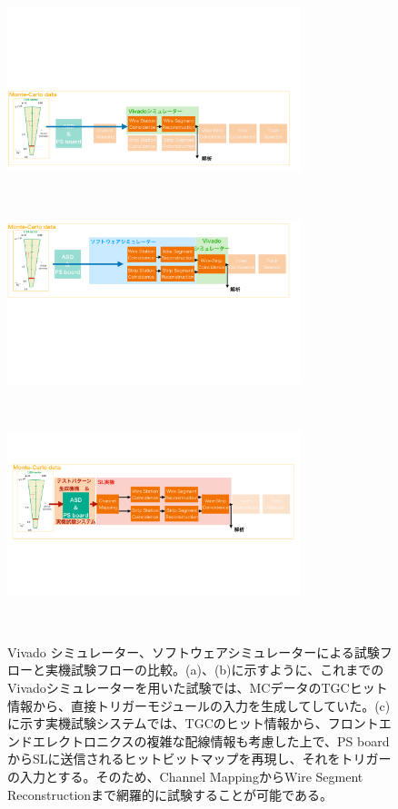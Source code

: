 \begin{figure}
    \begin{minipage}[b]{0.9\linewidth}
    \centering
    \includegraphics[height=4.8cm]{fig/Test/Flow_Wire.pdf}
    \end{minipage}\\
    \begin{minipage}[b]{0.9\linewidth}
        \centering
        \includegraphics[height=4.8cm]{fig/Test/Flow_WS.pdf}
    \end{minipage}\\
        \begin{minipage}[b]{0.9\linewidth}
            \centering
            \includegraphics[height=4.8cm]{fig/Test/Flow_zikki.pdf}
        \end{minipage}\\
    
    \caption[試験フロー]{Vivado シミュレーター、ソフトウェアシミュレーターによる試験フローと実機試験フローの比較。(a)、(b)に示すように、これまでのVivadoシミュレーターを用いた試験では、MCデータのTGCヒット情報から、直接トリガーモジュールの入力を生成してしていた。(c)に示す実機試験システムでは、TGCのヒット情報から、フロントエンドエレクトロニクスの複雑な配線情報も考慮した上で、PS boardからSLに送信されるヒットビットマップを再現し、それをトリガーの入力とする。そのため、Channel MappingからWire Segment Reconstructionまで網羅的に試験することが可能である。}
    \label{Test_Flow}
\end{figure}

